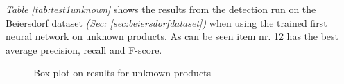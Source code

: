 \textit{Table \ref{tab:test1unknown}} shows the results from the detection run on the Beiersdorf dataset \textit{(Sec: \ref{sec:beiersdorfdataset})} when using the trained first neural network on unknown products. As can be seen item nr. 12 has the best average precision, recall and F-score.

\clearpage

\begin{figure}[h]
    \centering
    \hfill
    
    \caption{Box plot on results for unknown products}
    \label{fig:unknowniou}
\end{figure}

